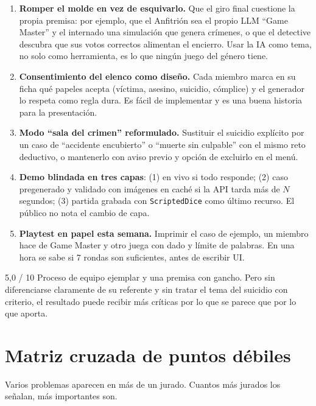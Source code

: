 \documentclass[11pt,a4paper]{article}
\begin{document}
\begin{inedito}
\begin{enumerate}
\item \textbf{Romper el molde en vez de esquivarlo.} Que el giro final cuestione la propia premisa:
por ejemplo, que el Anfitrión sea el propio LLM ``Game Master'' y el internado una simulación que
genera crímenes, o que el detective descubra que sus votos correctos alimentan el encierro. Usar la
IA como tema, no solo como herramienta, es lo que ningún juego del género tiene.
\item \textbf{Consentimiento del elenco como diseño.} Cada miembro marca en su ficha qué papeles
acepta (víctima, asesino, suicidio, cómplice) y el generador lo respeta como regla dura. Es
fácil de implementar y es una buena historia para la presentación.
\item \textbf{Modo ``sala del crimen'' reformulado.} Sustituir el suicidio explícito por un caso de
``accidente encubierto'' o ``muerte sin culpable'' con el mismo reto deductivo, o mantenerlo con
aviso previo y opción de excluirlo en el menú.
\item \textbf{Demo blindada en tres capas}: (1) en vivo si todo responde; (2) caso pregenerado y
validado con imágenes en caché si la API tarda más de $N$ segundos; (3) partida grabada con
\texttt{ScriptedDice} como último recurso. El público no nota el cambio de capa.
\item \textbf{Playtest en papel esta semana.} Imprimir el caso de ejemplo, un miembro hace de
Game Master y otro juega con dado y límite de palabras. En una hora se sabe si 7 rondas son
suficientes, antes de escribir UI.
\end{enumerate}
\end{inedito}

\begin{veredicto}{5,0 / 10}
Proceso de equipo ejemplar y una premisa con gancho. Pero sin diferenciarse claramente de su
referente y sin tratar el tema del suicidio con criterio, el resultado puede recibir más críticas por
lo que se parece que por lo que aporta.
\end{veredicto}

\section{Matriz cruzada de puntos débiles}\label{sec:matriz}

Varios problemas aparecen en más de un jurado. Cuantos más jurados los señalan, más importantes son.
\end{document}
